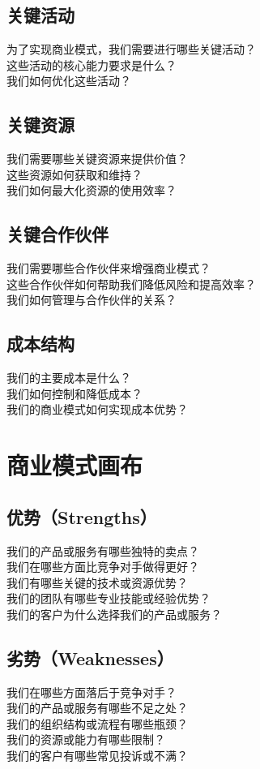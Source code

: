 \documentclass[12pt]{book}
\begin{document}
\subsection{关键活动}
为了实现商业模式，我们需要进行哪些关键活动？\\
这些活动的核心能力要求是什么？\\
我们如何优化这些活动？\\

\subsection{关键资源}
我们需要哪些关键资源来提供价值？\\
这些资源如何获取和维持？\\
我们如何最大化资源的使用效率？\\

\subsection{关键合作伙伴}
我们需要哪些合作伙伴来增强商业模式？\\
这些合作伙伴如何帮助我们降低风险和提高效率？\\
我们如何管理与合作伙伴的关系？\\

\subsection{成本结构}
我们的主要成本是什么？\\
我们如何控制和降低成本？\\
我们的商业模式如何实现成本优势？\\


\section{商业模式画布}
\subsection{优势（Strengths）}
我们的产品或服务有哪些独特的卖点？\\
我们在哪些方面比竞争对手做得更好？\\
我们有哪些关键的技术或资源优势？\\
我们的团队有哪些专业技能或经验优势？\\
我们的客户为什么选择我们的产品或服务？\\

\subsection{劣势（Weaknesses）}
我们在哪些方面落后于竞争对手？\\
我们的产品或服务有哪些不足之处？\\
我们的组织结构或流程有哪些瓶颈？\\
我们的资源或能力有哪些限制？\\
我们的客户有哪些常见投诉或不满？\\
\end{document}
